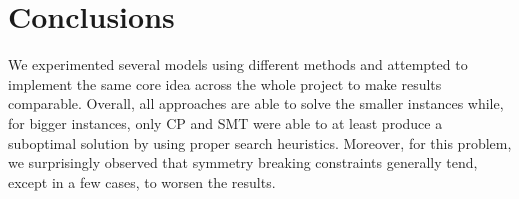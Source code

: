 \documentclass{article}
\begin{document}
    
    
    
    


    \section{Conclusions}

    We experimented several models using different methods and attempted to implement the same core idea across the whole project to make results comparable. Overall, all approaches are able to solve the smaller instances while, for bigger instances, only CP and SMT were able to at least produce a suboptimal solution by using proper search heuristics. Moreover, for this problem, we surprisingly observed that symmetry breaking constraints generally tend, except in a few cases, to worsen the results.

    \printbibliography
\end{document}
